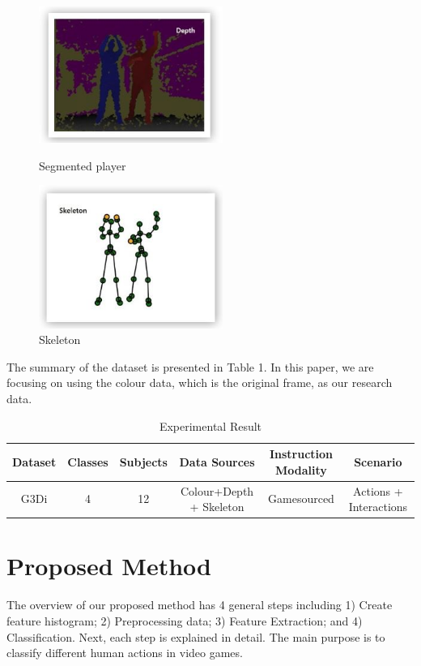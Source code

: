 \documentclass[runningheads,a4paper]{llncs}
\begin{document}
	\begin{figure}[htbp]
	\centering
	\begin{minipage}[t]{0.48\textwidth}
	\centering
	\includegraphics[width=6cm]{dataset-2.JPG}
	\caption{Segmented player}
	\label{fig:Dataset-2}
	\end{minipage}
	\begin{minipage}[t]{0.48\textwidth}
	\centering
	\includegraphics[width=6cm]{dataset-3.JPG}
	\caption{Skeleton}
	\label{fig:Dataset-3}
	\end{minipage}
	\end{figure}

	The summary of the dataset is presented in Table 1.\cite{1} In this paper, we are focusing on using the colour data, which is the original frame, as our research data.

	\begin{table}[!hbp]
	\begin{tabular}{|c|c|c|c|c|c|}
	\hline
	Dataset	& Classes & Subjects & Data Sources & Instruction Modality & Scenario\\
	\hline
	G3Di & 4 & 12 & Colour+Depth + Skeleton & Gamesourced	& Actions + Interactions\\
	\hline
	\end{tabular}
	\caption{Experimental Result}
	\end{table}


\section{Proposed Method}

	The overview of our proposed method has 4 general steps including 1) Create feature histogram; 2) Preprocessing data; 3) Feature Extraction; and 4) Classification. Next, each step is explained in detail. The main purpose is to classify different human actions in video games.
\end{document}
